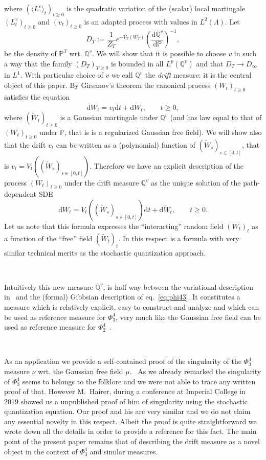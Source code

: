 \documentclass[11pt]{article}
\newcommand{\assign}{:=}
\newcommand{\mathd}{\mathrm{d}}
\newcommand{\tmtextit}[1]{{\itshape{#1}}}
\begin{document}
where $(\langle L^v \rangle_t)_{t \geqslant 0}$ is the quadratic variation of
the (scalar) local martingale $(L^v_t)_{t \geqslant 0}$ and $(v_t)_{t
\geqslant 0}$ is an adapted process with values in $L^2 (\Lambda)$. Let
\[ D_T \assign \frac{1}{Z_T} e^{- V_T (W_T)} \left( \frac{\mathd
   \mathbb{Q}^v}{\mathd \mathbb{P}} \right)^{- 1}, \]
be the density of $\mathbb{P}^T$ wrt. $\mathbb{Q}^v$. We will show that it is
possible to choose $v$ in such a way that the family $(D_T)_{T \geqslant 0}$
is bounded in all $L^p (\mathbb{Q}^v)$ and that $D_T \rightarrow D_{\infty}$
in $L^1$. With particular choice of $v$ we call $\mathbb{Q}^v$ the
\tmtextit{drift} measure: it is the central object of this paper. By
Girsanov's theorem the canonical process $(W_t)_{t \geqslant 0}$ satisfies the
equation
\[ \mathd W_t = v_t \mathd t + \mathd \tilde{W}_t, \qquad t \geqslant 0, \]
where $(\tilde{W}_t)_{t \geqslant 0}$ is a Gaussian martingale under
$\mathbb{Q}^v$ (and has law equal to that of $(W_t)_{t \geqslant 0}$ under
$\mathbb{P}$, that is is a regularized Gaussian free field). We will show also
that the drift $v_t$ can be written as a (polynomial) function of
$(\tilde{W}_s)_{s \in [0, t]}$, that is $v_t = V_t ((\tilde{W}_s)_{s \in [0,
t]})$. Therefore we have an explicit description of the process $(W_t)_{t
\geqslant 0}$ under the drift measure $\mathbb{Q}^v$ as the unique solution of
the path-dependent SDE
\begin{equation}
  \mathd W_t = V_t ((\tilde{W}_s)_{s \in [0, t]}) \mathd t + \mathd
  \tilde{W}_t, \qquad t \geqslant 0. \label{eq:sde-girs}
\end{equation}
Let us note that this formula expresses the ``interacting'' random field
$(W_t)_t$ as a function of the ``free'' field $(\tilde{W}_t)_t$. In this
respect is a formula with very similar technical merits as the stochastic
quantization approach.

\

Intuitively this new measure $\mathbb{Q}^v$, is half way between the
variational description in~{\cite{barashkov_gubinelli_variational}} and the
(formal) Gibbsian description of eq.~{\eqref{eq:phi43}}. It constitutes a
measure which is relatively explicit, easy to construct and analyze and which
can be used as reference measure for $\Phi^4_3$, very much like the Gaussian
free field can be used as reference measure for
$\Phi^4_2$~{\cite{glimm_quantum_1987}}.

\

As an application we provide a self-contained proof of the singularity of the
$\Phi^4_3$ measure $\nu$ wrt. the Gaussian free field $\mu$. \ As we already
remarked the singularity of $\Phi^4_3$ seems to belongs to the folklore and we
were not able to trace any written proof of that. However M.~Hairer, during a
conference at Imperial College in 2019 showed us a unpublished proof of him of
singularity using the stochastic quantization equation. Our proof and his are
very similar and we do not claim any essential novelty in this respect. Albeit
the proof is quite straightforward we wrote down all the details in order to
provide a reference for this fact. The main point of the present paper remains
that of describing the drift measure as a novel object in the context of
$\Phi^4_3$ and similar measures.
\end{document}
